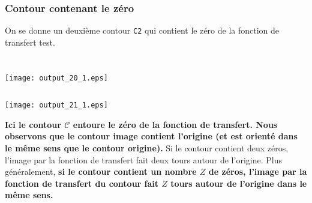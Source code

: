 \subsubsection{Contour contenant le zéro\label{contour-contenant-le-zuxe9ro}}
On se donne un deuxième contour \texttt{C2} qui contient le zéro de la
fonction de transfert test.
\begin{tcolorbox}[breakable, size=fbox, boxrule=1pt, pad at break*=1mm,colback=cellbackground, colframe=cellborder]
\inputminted{python}{codes/python/annexe_cauchy_cellule9.py}
\end{tcolorbox}
\begin{tcolorbox}[breakable, size=fbox, boxrule=1pt, pad at break*=1mm,colback=cellbackground, colframe=cellborder]
\inputminted{python}{codes/python/annexe_cauchy_cellule10.py}
\end{tcolorbox}
\begin{center}
    \texttt{[image: output\_20\_1.eps]}
\end{center}
\begin{tcolorbox}[breakable, size=fbox, boxrule=1pt, pad at break*=1mm,colback=cellbackground, colframe=cellborder]
\inputminted{python}{codes/python/annexe_cauchy_cellule11.py}
\end{tcolorbox}
\begin{center}
    \texttt{[image: output\_21\_1.eps]}
\end{center}
\textbf{Ici le contour \(\mathcal{C}\) entoure le zéro de la fonction de
transfert. Nous observons que le contour image contient l'origine (et
est orienté dans le même sens que le contour origine).} 
Si le contour contient deux zéros, l'image par la fonction de transfert
fait deux tours autour de l'origine. Plus généralement, \textbf{si le
contour contient un nombre \(Z\) de zéros, l'image par la fonction de
transfert du contour fait \(Z\) tours autour de l'origine dans le même
sens.} 
